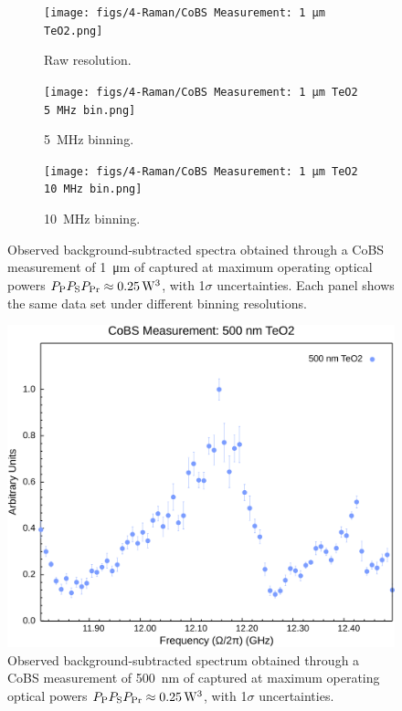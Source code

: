 \begin{figure}[th!]
  \centering
  \begin{subfigure}[b]{0.85\textwidth}
    \centering
    \hspace{-2em}\texttt{[image: figs/4-Raman/CoBS Measurement: 1 μm TeO2.png]}
    \caption{Raw resolution.}
    \label{fig:Raman:1umTeO2Raw}
  \end{subfigure}

  \vspace{1em}

  \begin{subfigure}[b]{0.49\textwidth}
    \centering
    \texttt{[image: figs/4-Raman/CoBS Measurement: 1 μm TeO2 5 MHz bin.png]}
    \caption{\SI{5}{\mega\hertz} binning.}
    \label{fig:Raman:1umTeO25MHzBin}
  \end{subfigure}
  \hfill
  \begin{subfigure}[b]{0.49\textwidth}
    \centering
    \texttt{[image: figs/4-Raman/CoBS Measurement: 1 μm TeO2 10 MHz bin.png]}
    \caption{\SI{10}{\mega\hertz} binning.}
    \label{fig:Raman:1umTeO10MHzBin}
  \end{subfigure}

  \caption[Observed spectra obtained through a \ac{CoBS} measurement of \SI{1}{\micro\meter} of .]{Observed background-subtracted spectra obtained through a \ac{CoBS} measurement of \SI{1}{\micro\meter} of  captured at maximum operating optical powers \(P_{\rm P}P_{\rm S}P_{\rm Pr} \approx \SI{0.25}{\cubic\watt}\), with 1\(\sigma\) uncertainties. Each panel shows the same data set under different binning resolutions.}
  \label{fig:Raman:1umTeO2_combined}
\end{figure}

\begin{figure}[t]
  \centering
  \hspace{-2em}\includegraphics[width=.85\textwidth]{figs/4-Raman/CoBS Measurement: 500 nm TeO2.png}
  \caption[Observed spectrum obtained through a \ac{CoBS} measurement of \SI{500}{\nano\meter} of .]{Observed background-subtracted spectrum obtained through a \ac{CoBS} measurement of \SI{500}{\nano\meter} of  captured at maximum operating optical powers \(P_{\rm P}P_{\rm S}P_{\rm Pr} \approx \SI{0.25}{\cubic\watt}\), with 1\(\sigma\) uncertainties.}
  \label{fig:Raman:500nmTeO2}
\end{figure}

